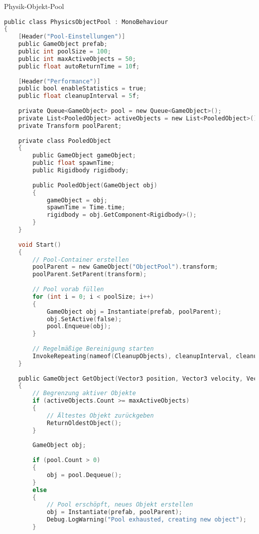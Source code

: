 \begin{code}{Physik-Objekt-Pool}\\
\begin{lstlisting}[language=C, style=basesmol]
public class PhysicsObjectPool : MonoBehaviour 
{
    [Header("Pool-Einstellungen")]
    public GameObject prefab;
    public int poolSize = 100;
    public int maxActiveObjects = 50;
    public float autoReturnTime = 10f;
    
    [Header("Performance")]
    public bool enableStatistics = true;
    public float cleanupInterval = 5f;
    
    private Queue<GameObject> pool = new Queue<GameObject>();
    private List<PooledObject> activeObjects = new List<PooledObject>();
    private Transform poolParent;
    
    private class PooledObject 
    {
        public GameObject gameObject;
        public float spawnTime;
        public Rigidbody rigidbody;
        
        public PooledObject(GameObject obj) 
        {
            gameObject = obj;
            spawnTime = Time.time;
            rigidbody = obj.GetComponent<Rigidbody>();
        }
    }
    
    void Start() 
    {
        // Pool-Container erstellen
        poolParent = new GameObject("ObjectPool").transform;
        poolParent.SetParent(transform);
        
        // Pool vorab füllen
        for (int i = 0; i < poolSize; i++) 
        {
            GameObject obj = Instantiate(prefab, poolParent);
            obj.SetActive(false);
            pool.Enqueue(obj);
        }
        
        // Regelmäßige Bereinigung starten
        InvokeRepeating(nameof(CleanupObjects), cleanupInterval, cleanupInterval);
    }
    
    public GameObject GetObject(Vector3 position, Vector3 velocity, Vector3 angularVelocity = default) 
    {
        // Begrenzung aktiver Objekte
        if (activeObjects.Count >= maxActiveObjects) 
        {
            // Ältestes Objekt zurückgeben
            ReturnOldestObject();
        }
        
        GameObject obj;
        
        if (pool.Count > 0) 
        {
            obj = pool.Dequeue();
        } 
        else 
        {
            // Pool erschöpft, neues Objekt erstellen
            obj = Instantiate(prefab, poolParent);
            Debug.LogWarning("Pool exhausted, creating new object");
        }
        

\end{lstlisting}
\end{code}
